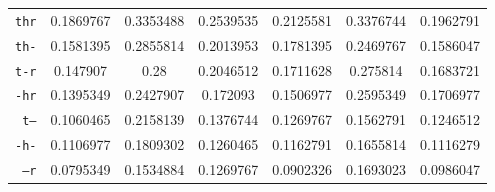 \documentclass[../main.tex]{subfiles}
\begin{document}
\begin{table}[ht]
\begin{small}
\begin{tabular}{|r|c|c|c|c|c|c|}
		\hline
		\texttt{thr} & 0.1869767 & 0.3353488 & 0.2539535 & 0.2125581 & 0.3376744 & 0.1962791 \\
		\texttt{th-} & 0.1581395 & 0.2855814 & 0.2013953 & 0.1781395 & 0.2469767 & 0.1586047 \\
		\texttt{t-r} & 0.147907 & 0.28 & 0.2046512 & 0.1711628 & 0.275814 & 0.1683721 \\
		\texttt{-hr} & 0.1395349 & 0.2427907 & 0.172093 & 0.1506977 & 0.2595349 & 0.1706977 \\
		\texttt{t--} & 0.1060465 & 0.2158139 & 0.1376744 & 0.1269767 & 0.1562791 & 0.1246512 \\
		\texttt{-h-} & 0.1106977 & 0.1809302 & 0.1260465 & 0.1162791 & 0.1655814 & 0.1116279 \\
		\texttt{--r} & 0.0795349 & 0.1534884 & 0.1269767 & 0.0902326 & 0.1693023 & 0.0986047 \\
		\hline
	\end{tabular}
	\end{small}
\end{table}
\end{document}
